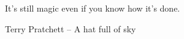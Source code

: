 
\chapter*{  }
\vfill
\begin{center}
It's still magic even if you know how it's done.

Terry Pratchett -- A hat full of sky
\end{center}
\vfill
